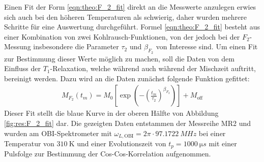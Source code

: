 Einen Fit der Form \eqref{eqn:theo:F_2_fit} direkt an die Messwerte anzulegen erwies sich auch bei den höheren Temperaturen als schwierig, daher wurden mehrere Schritte für eine Auswertung durchgeführt. Formel \eqref{eqn:theo:F_2_fit} besteht aus einer Kombination von zwei Kohlrausch-Funktionen, von der jedoch bei der $F_2$-Messung insbesondere die Parameter $\tau_2$ und $\beta_{F_2}$ von Interesse sind. Um einen Fit zur Bestimmung dieser Werte möglich zu machen, soll die Daten von dem Einfluss der $T_1$-Relaxation, welche während auch während der Mischzeit auftritt, bereinigt werden. Dazu wird an die Daten zunächst folgende Funktion gefittet:
\begin{align}
	M_{F_2} (t_m) = M_0 \left[ \exp{ \left(- { \left( \frac{t_m}{\tau_2} \right) }^{\beta_{F_2}} \right)} \right] + M_\text{off} \label{eqn:res:F_2_fit}
\end{align}
Dieser Fit stellt die blaue Kurve in der oberen Hälfte von Abbildung \ref{fig:res:F_2_fit} dar. Die gezeigten Daten entstammen der Messreihe MR2 und wurden am OBI-Spektrometer mit $\omega_{L, \text{OBI}} = 2\pi \cdot \SI{97.1722}{MHz}$ bei einer Temperatur von $\SI{310}{\kelvin}$ und einer Evolutionszeit von $t_p = \SI{1000}{\micro s}$ mit einer Pulsfolge zur Bestimmung der Cos-Cos-Korrelation aufgenommen.
